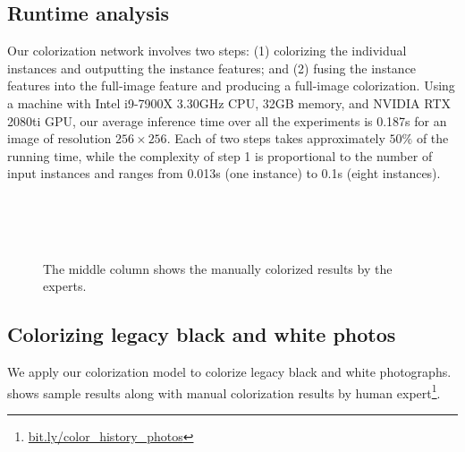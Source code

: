 \subsection{Runtime analysis}
Our colorization network involves two steps: 
(1) colorizing the individual instances and outputting the instance features; and 
(2) fusing the instance features into the full-image feature and producing a full-image colorization.
Using a machine with Intel i9-7900X 3.30GHz CPU, 32GB memory, and NVIDIA RTX 2080ti GPU, our average inference time over all the experiments is 0.187s for an image of resolution $256\times256$.
Each of two steps takes approximately $50\%$ of the running time, while the complexity of step 1 is proportional to the number of input instances and ranges from 0.013s (one instance) to 0.1s (eight instances).

\begin{figure}[!b]
     \hfill
     \hfill
    \\
     \hfill
     \hfill
    \\
     \hfill
     \hfill
    \\
     \hfill
     \hfill
    
    \caption{ 
    The middle column shows the manually colorized results by the experts.}
    \label{fig:legacy}
\end{figure} 
\subsection{Colorizing legacy black and white photos}
\label{sec:legacy}
We apply our colorization model to colorize legacy black and white photographs. 
 shows sample results along with manual colorization results by human expert\footnote{\url{bit.ly/color_history_photos}}.





